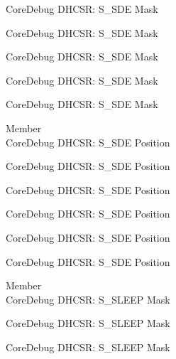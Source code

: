 \begin{DoxyRefList}
\label{deprecated__deprecated000471}%
%
Core\+Debug DHCSR\+: S\+\_\+\+SDE Mask 

\label{deprecated__deprecated000573}%
%
Core\+Debug DHCSR\+: S\+\_\+\+SDE Mask 

\label{deprecated__deprecated000679}%
%
Core\+Debug DHCSR\+: S\+\_\+\+SDE Mask 

\label{deprecated__deprecated001130}%
%
Core\+Debug DHCSR\+: S\+\_\+\+SDE Mask 

\label{deprecated__deprecated001232}%
%
Core\+Debug DHCSR\+: S\+\_\+\+SDE Mask  
\item[Member \doxylink{group___c_m_s_i_s___s_c_b_ga34b00f5a0109d236647be6609d6f04b3}{Core\+Debug\+\_\+\+DHCSR\+\_\+\+S\+\_\+\+SDE\+\_\+\+Pos} ]\hfill \\
\label{deprecated__deprecated000019}%
%
Core\+Debug DHCSR\+: S\+\_\+\+SDE Position 

\label{deprecated__deprecated000470}%
%
Core\+Debug DHCSR\+: S\+\_\+\+SDE Position 

\label{deprecated__deprecated000572}%
%
Core\+Debug DHCSR\+: S\+\_\+\+SDE Position 

\label{deprecated__deprecated000678}%
%
Core\+Debug DHCSR\+: S\+\_\+\+SDE Position 

\label{deprecated__deprecated001129}%
%
Core\+Debug DHCSR\+: S\+\_\+\+SDE Position 

\label{deprecated__deprecated001231}%
%
Core\+Debug DHCSR\+: S\+\_\+\+SDE Position  
\item[Member \doxylink{group___c_m_s_i_s___core_debug_ga98d51538e645c2c1a422279cd85a0a25}{Core\+Debug\+\_\+\+DHCSR\+\_\+\+S\+\_\+\+SLEEP\+\_\+\+Msk} ]\hfill \\
\label{deprecated__deprecated000024}%
%
Core\+Debug DHCSR\+: S\+\_\+\+SLEEP Mask 

\label{deprecated__deprecated000116}%
%
Core\+Debug DHCSR\+: S\+\_\+\+SLEEP Mask 

\label{deprecated__deprecated000170}%
%
Core\+Debug DHCSR\+: S\+\_\+\+SLEEP Mask 


\end{DoxyRefList}

